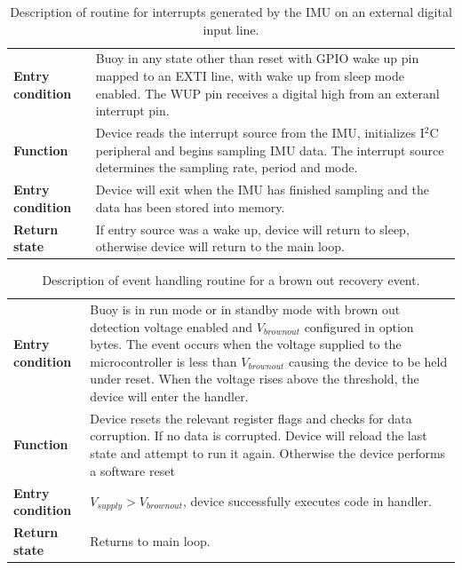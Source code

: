 \begin{table}[H]
	\centering
	\caption{Description of routine for interrupts generated by the IMU on an external digital input line.}
	\setlength{\extrarowheight}{5pt}
	\begin{tabular}{|>{\raggedright\arraybackslash}m{}|>{\raggedright\arraybackslash}m{}|}
		\hline
		\multicolumn{2}{|l|}{\textbf{IMU motion event detection}} \\
		\hline
		\textbf{Entry condition}  & Buoy in any state other than reset with GPIO wake up pin mapped to an EXTI line, with wake up from sleep mode enabled. The WUP pin receives a digital high from an exteranl interrupt pin.\\
		\hline
		\textbf{Function} & Device reads the interrupt source from the IMU, initializes I$^2$C peripheral and begins sampling IMU data. The interrupt source determines the sampling rate, period and mode.\\
		\hline
		\textbf{Entry condition} & Device will exit when the IMU has finished sampling and the data has been stored into memory.\\
		\hline
		\textbf{Return state} & If entry source was a wake up, device will return to sleep, otherwise device will return to the main loop.\\
		\hline
	\end{tabular}
	
	\label{tab:Int_desc_IMU}
\end{table}

\begin{table}[H]
	\centering
	\caption{Description of event handling routine for a brown out recovery event.}
	\setlength{\extrarowheight}{5pt}
	\begin{tabular}{|>{\raggedright\arraybackslash}m{}|>{\raggedright\arraybackslash}m{}|}
		\hline
		\multicolumn{2}{|l|}{\textbf{Brown out detection}} \\
		\hline
		\textbf{Entry condition}  & Buoy is in run mode or in standby mode with brown out detection voltage enabled and $V_{brownout}$ configured in option bytes. The event occurs when the voltage supplied to the microcontroller is less than $V_{brownout}$  causing the device to be held under reset. When the voltage rises above the threshold, the device will enter the handler. \\
		\hline
		\textbf{Function} & Device resets the relevant register flags and checks for data corruption. If no data is corrupted. Device will reload the last state and attempt to run it again. Otherwise the device performs a software reset \\
		\hline
		\textbf{Entry condition} & $V_{supply} > V_{brownout}$, device successfully executes code in handler. \\
		\hline
		\textbf{Return state} & Returns to main loop.\\
		\hline
	\end{tabular}
	\label{tab:Ev_desc_BoD}
\end{table}

